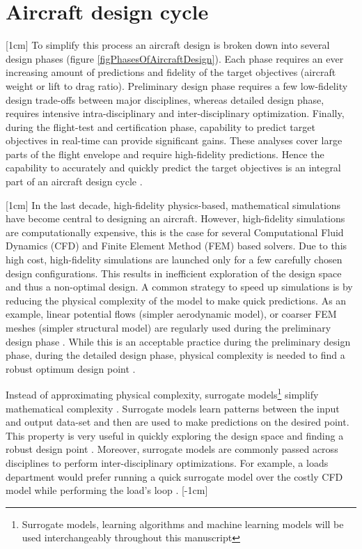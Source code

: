\section{Aircraft design cycle}\label{secSircraftDesignCycle}
[1cm]
To simplify this process an aircraft design is broken down into several design phases (figure \ref{figPhasesOfAircraftDesign}). Each phase requires an ever increasing amount of predictions and fidelity of the target objectives (aircraft weight or lift to drag ratio). Preliminary design phase requires a few low-fidelity design trade-offs between major disciplines, whereas detailed design phase, requires intensive intra-disciplinary and inter-disciplinary optimization. Finally, during the flight-test and certification phase, capability to predict target objectives in real-time can provide significant gains. These analyses cover large parts of the flight envelope and require high-fidelity predictions. Hence the capability to accurately and quickly predict the target objectives is an integral part of an aircraft design cycle \cite{raymer2012aircraft}. 

[1cm]
In the last decade, high-fidelity physics-based, mathematical simulations have become central to designing an aircraft. However, high-fidelity simulations are computationally expensive, this is the case for several Computational Fluid Dynamics (CFD) and Finite Element Method (FEM) based solvers. Due to this high cost, high-fidelity simulations are launched only for a few carefully chosen design configurations. This results in inefficient exploration of the design space and thus a non-optimal design. A common strategy to speed up simulations is by reducing the physical complexity of the model to make quick predictions. As an example, linear potential flows (simpler aerodynamic model), or coarser FEM meshes (simpler structural model) are regularly used during the preliminary design phase \cite{cummings2015applied}. While this is an acceptable practice during the preliminary design phase, during the detailed design phase, physical complexity is needed to find a robust optimum design point \cite{raymer2012aircraft}.


Instead of approximating physical complexity, surrogate models\footnote{Surrogate models, learning algorithms and machine learning models will be used interchangeably throughout this manuscript} simplify mathematical complexity \cite{verveld2016reduced}. Surrogate models learn patterns between the input and output data-set and then are used to make predictions on the desired point. This property is very useful in quickly exploring the design space and finding a robust design point \cite{forrester2008engineering}. Moreover, surrogate models are commonly passed across disciplines to perform inter-disciplinary optimizations. For example, a loads department would prefer running a quick surrogate model over the costly CFD model while performing the load's loop \cite{bartoliAIAA2017, bartoliAGILE2017}.  
[-1cm]

